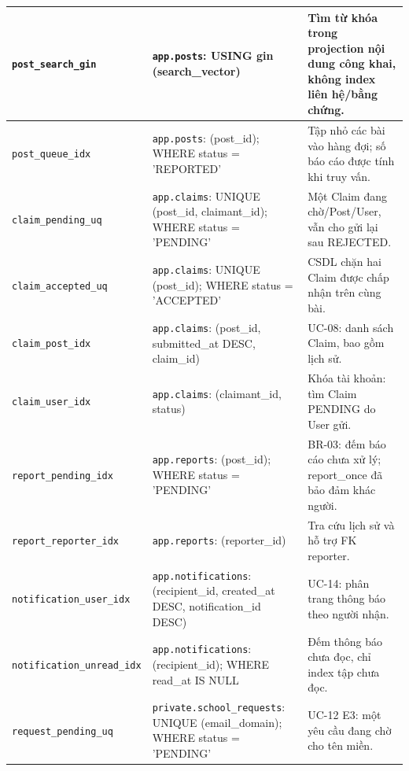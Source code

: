 \begin{longtable}{|>{\raggedright\arraybackslash}p{.23\linewidth}|>{\raggedright\arraybackslash}p{.34\linewidth}|>{\raggedright\arraybackslash}p{.35\linewidth}|}
\texttt{post\_\allowbreak{}search\_\allowbreak{}gin} & \texttt{app.posts}: USING gin (search\_\allowbreak{}vector) & Tìm từ khóa trong projection nội dung công khai,\allowbreak{} không index liên hệ/bằng chứng. \\ \hline
\texttt{post\_\allowbreak{}queue\_\allowbreak{}idx} & \texttt{app.posts}: (post\_\allowbreak{}id); WHERE status = 'REPORTED' & Tập nhỏ các bài vào hàng đợi; số báo cáo được tính khi truy vấn. \\ \hline
\texttt{claim\_\allowbreak{}pending\_\allowbreak{}uq} & \texttt{app.claims}: UNIQUE (post\_\allowbreak{}id,\allowbreak{} claimant\_\allowbreak{}id); WHERE status = 'PENDING' & Một Claim đang chờ/Post/User,\allowbreak{} vẫn cho gửi lại sau REJECTED. \\ \hline
\texttt{claim\_\allowbreak{}accepted\_\allowbreak{}uq} & \texttt{app.claims}: UNIQUE (post\_\allowbreak{}id); WHERE status = 'ACCEPTED' & CSDL chặn hai Claim được chấp nhận trên cùng bài. \\ \hline
\texttt{claim\_\allowbreak{}post\_\allowbreak{}idx} & \texttt{app.claims}: (post\_\allowbreak{}id,\allowbreak{} submitted\_\allowbreak{}at DESC,\allowbreak{} claim\_\allowbreak{}id) & UC-08: danh sách Claim,\allowbreak{} bao gồm lịch sử. \\ \hline
\texttt{claim\_\allowbreak{}user\_\allowbreak{}idx} & \texttt{app.claims}: (claimant\_\allowbreak{}id,\allowbreak{} status) & Khóa tài khoản: tìm Claim PENDING do User gửi. \\ \hline
\texttt{report\_\allowbreak{}pending\_\allowbreak{}idx} & \texttt{app.reports}: (post\_\allowbreak{}id); WHERE status = 'PENDING' & BR-03: đếm báo cáo chưa xử lý; report\_\allowbreak{}once đã bảo đảm khác người. \\ \hline
\texttt{report\_\allowbreak{}reporter\_\allowbreak{}idx} & \texttt{app.reports}: (reporter\_\allowbreak{}id) & Tra cứu lịch sử và hỗ trợ FK reporter. \\ \hline
\texttt{notification\_\allowbreak{}user\_\allowbreak{}idx} & \texttt{app.notifications}: (recipient\_\allowbreak{}id,\allowbreak{} created\_\allowbreak{}at DESC,\allowbreak{} notification\_\allowbreak{}id DESC) & UC-14: phân trang thông báo theo người nhận. \\ \hline
\texttt{notification\_\allowbreak{}unread\_\allowbreak{}idx} & \texttt{app.notifications}: (recipient\_\allowbreak{}id); WHERE read\_\allowbreak{}at IS NULL & Đếm thông báo chưa đọc,\allowbreak{} chỉ index tập chưa đọc. \\ \hline
\texttt{request\_\allowbreak{}pending\_\allowbreak{}uq} & \texttt{private.school\_\allowbreak{}requests}: UNIQUE (email\_\allowbreak{}domain); WHERE status = 'PENDING' & UC-12 E3: một yêu cầu đang chờ cho tên miền. \\ \hline

\end{longtable}

